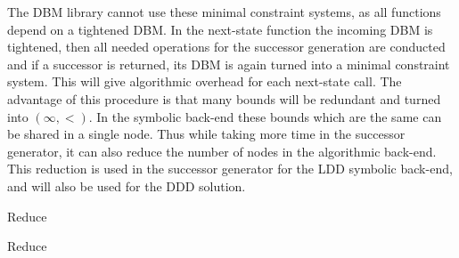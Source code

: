 The DBM library cannot use these minimal constraint systems, as all functions depend on a tightened DBM. In the next-state function the incoming DBM is tightened, then all needed operations for the successor generation are conducted and if a successor is returned, its DBM is again turned into a minimal constraint system. This will give algorithmic overhead for each next-state call. The advantage of this procedure is that many bounds will be redundant and turned into $(\infty,<)$. In the symbolic back-end these bounds which are the same can be shared in a single node. Thus while taking more time in the successor generator, it can also reduce the number of nodes in the algorithmic back-end. This reduction is used in the successor generator for the LDD symbolic back-end, and will also be used for the DDD solution.

\begin{algorithm}
\caption{Reduce}\label{alg:Reduce}
\begin{algorithmic}[1]
					\EndIf
				\EndIf
			\EndFor
		\EndFor
	\EndFor				
\EndProcedure
\end{algorithmic}
\end{algorithm}

\begin{algorithm}
\caption{Reduce}\label{alg:ReduceZero}
\begin{algorithmic}[1]
				\EndIf
			\EndFor
		\EndIf
	\EndFor
				\Break
			\EndIf
		\EndFor
	\EndFor
		\EndFor
	\EndFor
					\EndIf
				\EndFor
			\EndIf
		\EndFor
		\EndFor
	\EndFor
		
\EndProcedure
\end{algorithmic}
\end{algorithm}



